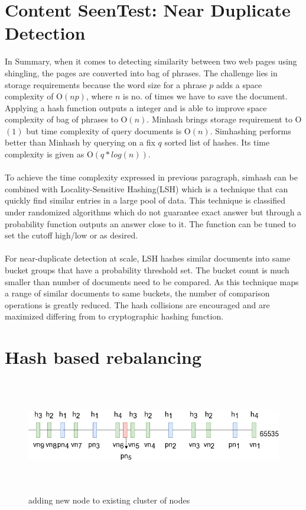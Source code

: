\section{Content SeenTest: Near Duplicate Detection}\label{handle_dedupe}
\noindent
In Summary, when it comes to detecting similarity between two web pages using shingling, the pages are converted into bag of phrases. The challenge lies in storage requirements because the word size for a phrase $p$ adds a space complexity of O$(np)$, where $n$ is no. of times we have to save the document. Applying a hash function outputs a integer and is able to improve space complexity of bag of phrases to O$(n)$. Minhash\cite{dedupe} brings storage requirement to O$(1)$ but time complexity of query documents is O$(n)$. Simhashing\cite{dedupe} performs better than Minhash by querying on a fix $q$ sorted list of hashes. Its time complexity is given as O$(q * log(n))$.
\\
\\
To achieve the time complexity expressed in previous paragraph, simhash can be
combined with Locality-Sensitive Hashing(LSH)\cite{lsh} which is a technique that
can quickly find similar entries in a large pool of data. This technique is
classified under randomized algorithms which do not guarantee exact answer but
through a probability function outputs an answer close to it. The function can be
tuned to set the cutoff high/low or as desired.
\\
\\
\noindent
For near-duplicate detection at scale, LSH hashes similar documents into same bucket groups that have
a probability threshold set. The bucket count is much smaller than number of documents need to be
compared. As this technique maps a range of similar documents to same buckets, the number of
comparison operations is greatly reduced. The hash collisions are encouraged and are maximized differing
from to cryptographic hashing function.

\pagebreak

\section{Hash based rebalancing}
\begin{figure}[h!]
  \centering
  \includegraphics[width=12cm,height=5cm,keepaspectratio]{../media/crawler/addingnode.png}
  \caption{adding new node to existing cluster of nodes}
  \label{fig:addingnode}
\end{figure}


